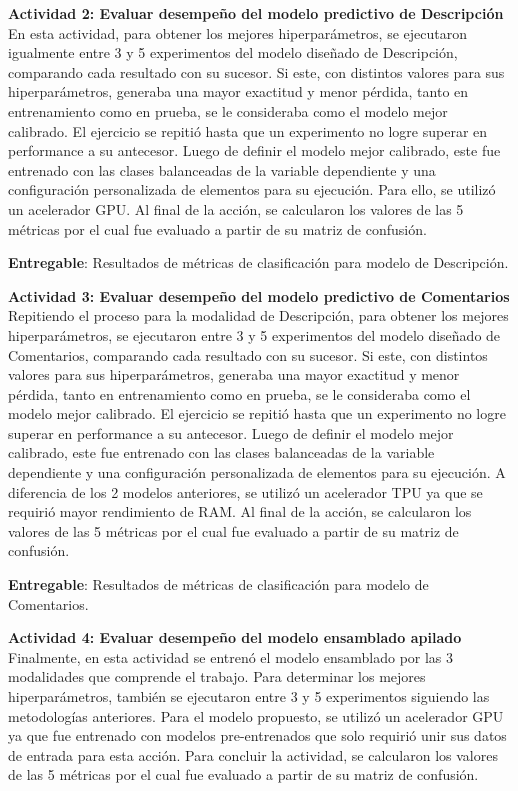 \textbf{Actividad 2: Evaluar desempeño del modelo predictivo de Descripción}
\\
En esta actividad, para obtener los mejores hiperparámetros, se ejecutaron igualmente entre 3 y 5 experimentos del modelo diseñado de Descripción, comparando cada resultado con su sucesor. Si este, con distintos valores para sus hiperparámetros, generaba una mayor exactitud y menor pérdida, tanto en entrenamiento como en prueba, se le consideraba como el modelo mejor calibrado. El ejercicio se repitió hasta que un experimento no logre superar en performance a su antecesor. Luego de definir el modelo mejor calibrado, este fue entrenado con las clases balanceadas de la variable dependiente y una configuración personalizada de elementos para su ejecución. Para ello, se utilizó un acelerador GPU. Al final de la acción, se calcularon los valores de las 5 métricas por el cual fue evaluado a partir de su matriz de confusión.

\textbf{Entregable}: Resultados de métricas de clasificación para modelo de Descripción.

\vspace{0.5cm}
\textbf{Actividad 3: Evaluar desempeño del modelo predictivo de Comentarios}
\\
Repitiendo el proceso para la modalidad de Descripción, para obtener los mejores hiperparámetros, se ejecutaron entre 3 y 5 experimentos del modelo diseñado de Comentarios, comparando cada resultado con su sucesor. Si este, con distintos valores para sus hiperparámetros, generaba una mayor exactitud y menor pérdida, tanto en entrenamiento como en prueba, se le consideraba como el modelo mejor calibrado. El ejercicio se repitió hasta que un experimento no logre superar en performance a su antecesor. Luego de definir el modelo mejor calibrado, este fue entrenado con las clases balanceadas de la variable dependiente y una configuración personalizada de elementos para su ejecución. A diferencia de los 2 modelos anteriores, se utilizó un acelerador TPU ya que se requirió mayor rendimiento de RAM. Al final de la acción, se calcularon los valores de las 5 métricas por el cual fue evaluado a partir de su matriz de confusión.

\textbf{Entregable}: Resultados de métricas de clasificación para modelo de Comentarios.

\vspace{0.5cm}
\textbf{Actividad 4: Evaluar desempeño del modelo ensamblado apilado}
\\
Finalmente, en esta actividad se entrenó el modelo ensamblado por las 3 modalidades que comprende el trabajo. Para determinar los mejores hiperparámetros, también se ejecutaron entre 3 y 5 experimentos siguiendo las metodologías anteriores. Para el modelo propuesto, se utilizó un acelerador GPU ya que fue entrenado con modelos pre-entrenados que solo requirió unir sus datos de entrada para esta acción. Para concluir la actividad, se calcularon los valores de las 5 métricas por el cual fue evaluado a partir de su matriz de confusión.


